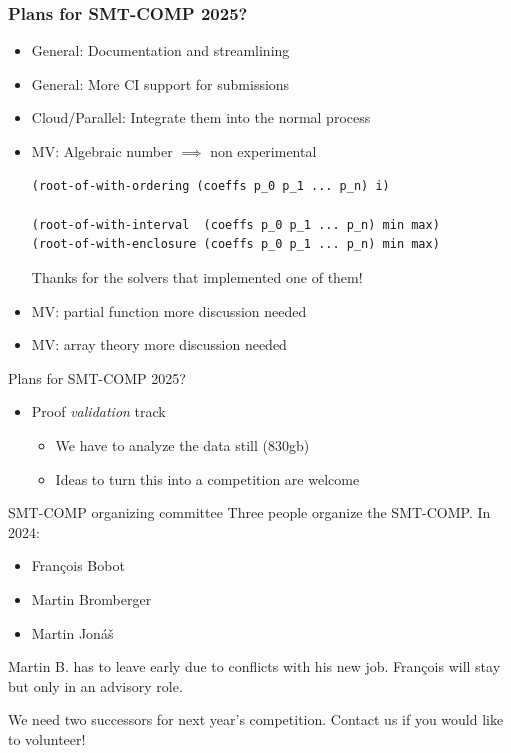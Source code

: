 \documentclass[table]{beamer}
\begin{document}
\begin{frame}[fragile]
  \frametitle{Plans for SMT-COMP 2025?}
  \begin{itemize}
    \item General: Documentation and streamlining
    \item General: More CI support for submissions
    \item Cloud/Parallel: Integrate them into the normal process
    \item MV: Algebraic number $\implies$ non experimental
\begin{verbatim}
(root-of-with-ordering (coeffs p_0 p_1 ... p_n) i)

(root-of-with-interval  (coeffs p_0 p_1 ... p_n) min max)
(root-of-with-enclosure (coeffs p_0 p_1 ... p_n) min max)
\end{verbatim}
    Thanks for the solvers that implemented one of them!
    \item MV: partial function more discussion needed
    \item MV: array theory more discussion needed
  \end{itemize}
\end{frame}

\begin{frame}{Plans for SMT-COMP 2025?}
  \begin{itemize}
    \item Proof \textit{validation} track
      \begin{itemize}
        \item We have to analyze the data still (830gb)
        \item Ideas to turn this into a competition are welcome
      \end{itemize}

  \end{itemize}


\end{frame}

\begin{frame}{SMT-COMP organizing committee}
  Three people organize the SMT-COMP.  In 2024:
  \begin{itemize}
  \item Fran\c{c}ois Bobot
  \item Martin Bromberger
  \item Martin Jon\'{a}\v{s}
  \end{itemize}
  \bigskip

  Martin B. has to leave early due to conflicts with his new job.\newline\newline
  Fran\c{c}ois will stay but only in an advisory role.
  \bigskip

  We need two successors for next year's competition.
  Contact us if you would like to volunteer!
\end{frame}
\end{document}
